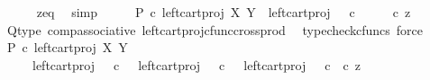 \begin{isabellebody}
\ \ \ \ \isamarkupfalse%
\ z{\isacharunderscore}{\kern0pt}eq\ \isamarkupfalse%
\ simp\isanewline
\ \ \isamarkupfalse%
\ \isamarkupfalse%
\ {\isachardoublequoteopen}P\ {\isasymcirc}\isactrlsub c\ left{\isacharunderscore}{\kern0pt}cart{\isacharunderscore}{\kern0pt}proj\ X\ Y\ {\isacharequal}{\kern0pt}\ {\isacharparenleft}{\kern0pt}left{\isacharunderscore}{\kern0pt}cart{\isacharunderscore}{\kern0pt}proj\ {\isasymOmega}\ {\isasymOmega}\ {\isasymcirc}\isactrlsub c\ {\isacharparenleft}{\kern0pt}{\isasymlangle}{\isasymt}{\isacharcomma}{\kern0pt}{\isasymt}{\isasymrangle}\ {\isasymamalg}\ {\isasymlangle}{\isasymf}{\isacharcomma}{\kern0pt}{\isasymf}{\isasymrangle}\ {\isasymamalg}\ {\isasymlangle}{\isasymf}{\isacharcomma}{\kern0pt}{\isasymt}{\isasymrangle}{\isacharparenright}{\kern0pt}{\isacharparenright}{\kern0pt}\ {\isasymcirc}\isactrlsub c\ z{\isachardoublequoteclose}\isanewline
\ \ \ \ \isamarkupfalse%
\ Q{\isacharunderscore}{\kern0pt}type\ comp{\isacharunderscore}{\kern0pt}associative{}\ left{\isacharunderscore}{\kern0pt}cart{\isacharunderscore}{\kern0pt}proj{\isacharunderscore}{\kern0pt}cfunc{\isacharunderscore}{\kern0pt}cross{\isacharunderscore}{\kern0pt}prod\ \isamarkupfalse%
\ {\isacharparenleft}{\kern0pt}typecheck{\isacharunderscore}{\kern0pt}cfuncs{\isacharcomma}{\kern0pt}\ force{\isacharparenright}{\kern0pt}\isanewline
\ \ \isamarkupfalse%
\ \isamarkupfalse%
\ {\isachardoublequoteopen}P\ {\isasymcirc}\isactrlsub c\ left{\isacharunderscore}{\kern0pt}cart{\isacharunderscore}{\kern0pt}proj\ X\ Y\isanewline
\ \ \ \ {\isacharequal}{\kern0pt}\ {\isacharparenleft}{\kern0pt}{\isacharparenleft}{\kern0pt}left{\isacharunderscore}{\kern0pt}cart{\isacharunderscore}{\kern0pt}proj\ {\isasymOmega}\ {\isasymOmega}\ {\isasymcirc}\isactrlsub c\ {\isasymlangle}{\isasymt}{\isacharcomma}{\kern0pt}{\isasymt}{\isasymrangle}{\isacharparenright}{\kern0pt}\ {\isasymamalg}\ {\isacharparenleft}{\kern0pt}left{\isacharunderscore}{\kern0pt}cart{\isacharunderscore}{\kern0pt}proj\ {\isasymOmega}\ {\isasymOmega}\ {\isasymcirc}\isactrlsub c\ {\isasymlangle}{\isasymf}{\isacharcomma}{\kern0pt}{\isasymf}{\isasymrangle}{\isacharparenright}{\kern0pt}\ {\isasymamalg}\ {\isacharparenleft}{\kern0pt}left{\isacharunderscore}{\kern0pt}cart{\isacharunderscore}{\kern0pt}proj\ {\isasymOmega}\ {\isasymOmega}\ {\isasymcirc}\isactrlsub c\ {\isasymlangle}{\isasymf}{\isacharcomma}{\kern0pt}{\isasymt}{\isasymrangle}{\isacharparenright}{\kern0pt}{\isacharparenright}{\kern0pt}\ {\isasymcirc}\isactrlsub c\ z{\isachardoublequoteclose}\isanewline

\end{isabellebody}
